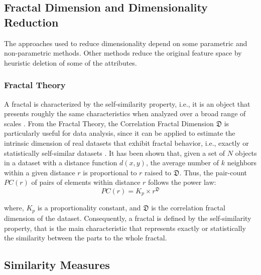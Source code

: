 \documentclass{article}
\begin{document}
\subsection{ Fractal Dimension and Dimensionality Reduction} %

The approaches used to reduce dimensionality depend on some parametric and non-parametric methods. Other methods reduce the original feature space by heuristic deletion of some of the attributes.
     	
\subsubsection{Fractal Theory } %
 

A fractal is characterized by the self-similarity property, i.e., it is an object that presents roughly the same characteristics when analyzed over a broad range of scales \cite{DBLP:journals/jidm/TrainaTWF10}. From the Fractal Theory, the Correlation Fractal Dimension $\mathfrak{D}$ is particularly useful for data analysis, since it can be applied to estimate the intrinsic dimension of real datasets that exhibit fractal behavior, i.e., exactly or statistically self-similar datasets \cite{DBLP:fractal2016}.   It has been shown that, given a set of $N$ objects in a dataset with a distance function $d(x,y)$, the average number of $k$ neighbors within a given distance $r$ is proportional to $r$ raised to $\mathfrak{D}$. Thus, the pair-count $PC(r)$ of pairs of elements within distance $r$ follows the power law:
\begin{equation}\label{eq:fractal}
       PC(r) = K_p \times r^{\mathfrak{D}}
    \end{equation}

     where, $K_p$ is a proportionality constant, and $\mathfrak{D}$ is the correlation fractal dimension of the dataset.
    Consequently, a fractal is defined by the self-similarity property, that is the main characteristic that represents exactly or statistically  the similarity between the parts to the whole fractal.
 


\subsection{Similarity Measures} %
\end{document}
